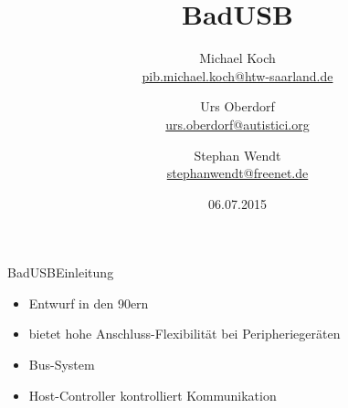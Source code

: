 \documentclass[xcolor=dvipsnames,pdftex]{beamer}
\title %
{BadUSB}
\author{Michael Koch\\
\href{mailto:pib.michael.koch@htw-saarland.de}{pib.michael.koch@htw-saarland.de}\\
\and{Urs Oberdorf\\
\href{mailto:urs.oberdorf@autistici.org}{urs.oberdorf@autistici.org}}\\
\and{Stephan Wendt\\
\href{mailto:stephanwendt@freenet.de}{stephanwendt@freenet.de}}}
\institute %
{
	Fakultät für Ingenieurwissenschaften\\
	Hochschule für Technik und Wirtschaft des Saarlandes
}
\date  %
{06.07.2015}
\begin{document}
\begin{frame}
	\titlepage
\end{frame}







\begin{frame}{BadUSB}{Einleitung}
	\begin{itemize}
		\item Entwurf in den 90ern
        \item bietet hohe Anschluss-Flexibilität bei Peripheriegeräten
        \item Bus-System
        \item Host-Controller kontrolliert Kommunikation
	\end{itemize}
\end{frame}
\end{document}

